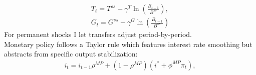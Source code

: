 \begin{gather}
T_{t}=T^{ss}-\gamma^{T}\ln\left(\frac{B_{t-1}}{B^{ss}}\right), \label{eq:T} \\
G_{t}=G^{ss}-\gamma^{G}\ln\left(\frac{B_{t-1}}{B^{ss}}\right) \label{eq:G}
\end{gather}
For permanent shocks I let transfers adjust period-by-period. \\
Monetary policy follows a Taylor rule which features interest rate smoothing but abstracts from specific output stabilization: 
\begin{gather*}
i_{t}=i_{t-1}\rho^{MP}+\left(1-\rho^{MP}\right)\left(i^{*}+\phi^{MP}\pi_{t}\right),
\end{gather*}









